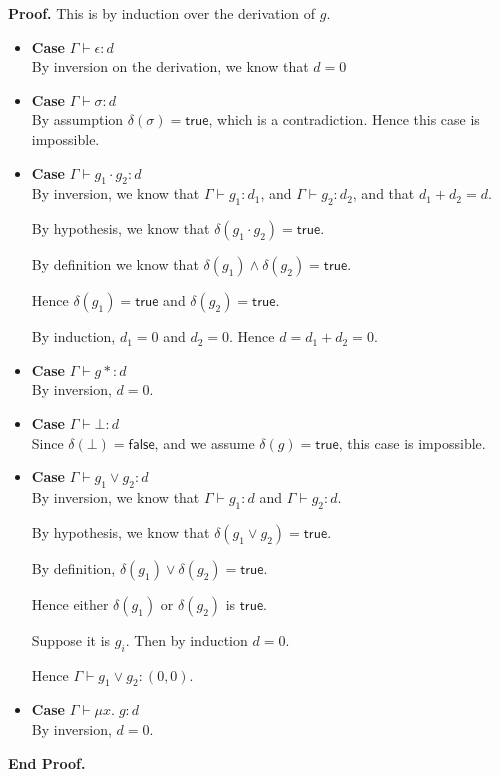 \documentclass{article}
\newcommand{\fix}[2]{\mu {#1}.\;{#2}}
\newcommand{\judgebalance}[3][\Gamma]{{#1} \vdash {#2} : {#3}}
\newcommand{\true}{\mathsf{true}}
\newcommand{\false}{\mathsf{false}}
\newcommand{\zero}{(0,0)}
\newcommand{\emptify}[1]{\delta({#1})}
\newenvironment{proof}{\noindent\textbf{Proof.}}{\noindent\textbf{End Proof.}}
\newenvironment{caseblock}{\begin{itemize}}{\end{itemize}}
\newenvironment{case}[1]{\item \textbf{Case} {#1}\\}{}
\begin{document}
\begin{proof}
  This is by induction over the derivation of $g$. 
  \begin{caseblock}
    \begin{case}{$\judgebalance{\epsilon}{d}$}
      By inversion on the derivation, we know that $d = 0$
    \end{case}

    \begin{case}{$\judgebalance{\sigma}{d}$}
      By assumption $\emptify{\sigma} = \true$, which is a contradiction. Hence this
      case is impossible. 
    \end{case}

    \begin{case}{$\judgebalance{g_1\cdot g_2}{d}$}
      By inversion, we know that $\judgebalance{g_1}{d_1}$, and
      $\judgebalance{g_2}{d_2}$, and that $d_1 + d_2 = d$.  

      By hypothesis, we know that $\emptify{g_1\cdot g_2} = \true$. 

      By definition we know that $\emptify{g_1} \land \emptify{g_2} =
      \true$. 

      Hence $\emptify{g_1} = \true$ and $\emptify{g_2} = \true$.

      By induction, $d_1 = 0$ and $d_2 = 0$. Hence $d = d_1 + d_2 = 0$. 
    \end{case}

    \begin{case}{$\judgebalance{g*}{d}$}
      By inversion, $d = 0$. 
    \end{case}

    \begin{case}{$\judgebalance{\bot}{d}$}
      Since $\emptify{\bot} = \false$, and we assume $\emptify{g} = \true$, this case is
      impossible. 
    \end{case}

    \begin{case}{$\judgebalance{g_1 \vee g_2}{d}$}
      By inversion, we know that $\judgebalance{g_1}{d}$ and $\judgebalance{g_2}{d}$. 
      
      By hypothesis, we know that $\emptify{g_1 \vee g_2} = \true$. 

      By definition, $\emptify{g_1} \vee \emptify{g_2} = \true$. 
      
      Hence either $\emptify{g_1}$ or $\emptify{g_2}$ is $\true$. 

      Suppose it is $g_i$. Then by induction $d = 0$. 

      Hence $\judgebalance{g_1 \vee g_2}{\zero}$. 
    \end{case}

    \begin{case}{$\judgebalance{\fix{x}{g}}{d}$}
      By inversion, $d = 0$. 
    \end{case}
  \end{caseblock}
\end{proof}
\end{document}
